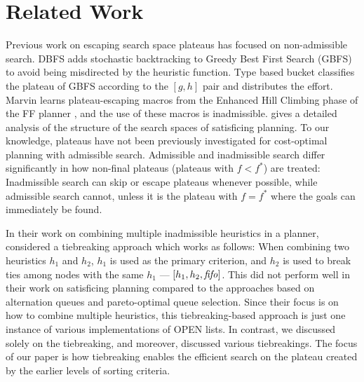 
\section{Related Work}

Previous work on escaping search space plateaus has focused on
non-admissible search.  DBFS \cite{imai2011novel} %
adds stochastic backtracking to Greedy Best First Search (GBFS) to avoid
being misdirected by the heuristic function. Type based bucket
\cite{xie14type} classifies the plateau of GBFS according to the
$[g,h]$ pair and distributes the effort.  Marvin \cite{Coles07} learns plateau-escaping macros
from the Enhanced Hill Climbing phase of the FF planner
\cite{Hoffmann01}, and the use of these macros is inadmissible.
\citeauthor{Hoffmann05} \citeyear{Hoffmann05,Hoffmann11} gives a detailed analysis of the
structure of the search spaces of satisficing planning.
% 
To our knowledge, plateaus have not been previously investigated for cost-optimal planning with admissible search.
Admissible and inadmissible search differ significantly in how non-final plateaus (plateaus with $f < f^*$) are treated:
Inadmissible search can skip or escape plateaus whenever possible, while
admissible search cannot, unless it is the plateau with $f=f^*$ where the goals can immediately be found.

In their work on combining multiple inadmissible heuristics in a planner,
\citeauthor{RogerH10} \citeyear{RogerH10} considered a tiebreaking approach which works as follows:
When combining two heuristics $h_1$ and $h_2$, $h_1$ is used as the primary criterion,
and $h_2$ is used to break ties among nodes with the same $h_1$ --- $[h_1,h_2,{\text{\textit{fifo}}}]$.
This did not perform well in their work on satisficing planning compared to the approaches based on alternation queues and pareto-optimal queue selection.
% 
Since their focus is on how to combine multiple heuristics,
this tiebreaking-based approach is just one instance of various implementations of OPEN lists.
In contrast, we discussed solely on the tiebreaking, and moreover, discussed various tiebreakings.
The focus of our paper is how tiebreaking enables the efficient search on the plateau created by the earlier levels of sorting criteria.

